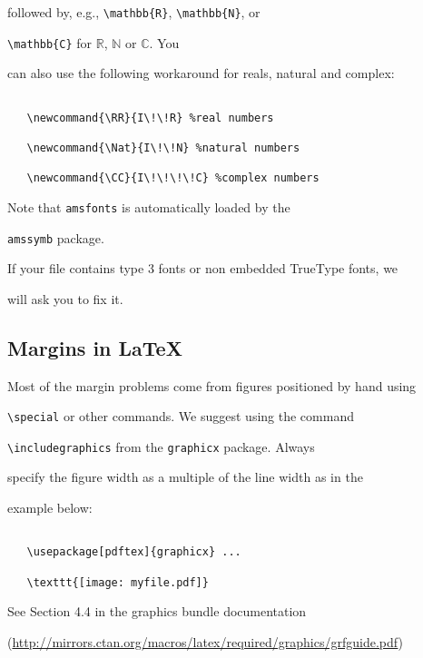 \documentclass{article}
\begin{document}
\begin{itemize}
followed by, e.g., \verb+\mathbb{R}+, \verb+\mathbb{N}+, or

\verb+\mathbb{C}+ for $\mathbb{R}$, $\mathbb{N}$ or $\mathbb{C}$.  You

can also use the following workaround for reals, natural and complex:

\begin{verbatim}

   \newcommand{\RR}{I\!\!R} %real numbers

   \newcommand{\Nat}{I\!\!N} %natural numbers

   \newcommand{\CC}{I\!\!\!\!C} %complex numbers

\end{verbatim}

Note that \verb+amsfonts+ is automatically loaded by the

\verb+amssymb+ package.



\end{itemize}



If your file contains type 3 fonts or non embedded TrueType fonts, we

will ask you to fix it.



\subsection{Margins in \LaTeX{}}



Most of the margin problems come from figures positioned by hand using

\verb+\special+ or other commands. We suggest using the command

\verb+\includegraphics+ from the \verb+graphicx+ package. Always

specify the figure width as a multiple of the line width as in the

example below:

\begin{verbatim}

   \usepackage[pdftex]{graphicx} ...

   \texttt{[image: myfile.pdf]}

\end{verbatim}

See Section 4.4 in the graphics bundle documentation

(\url{http://mirrors.ctan.org/macros/latex/required/graphics/grfguide.pdf})
\end{document}
